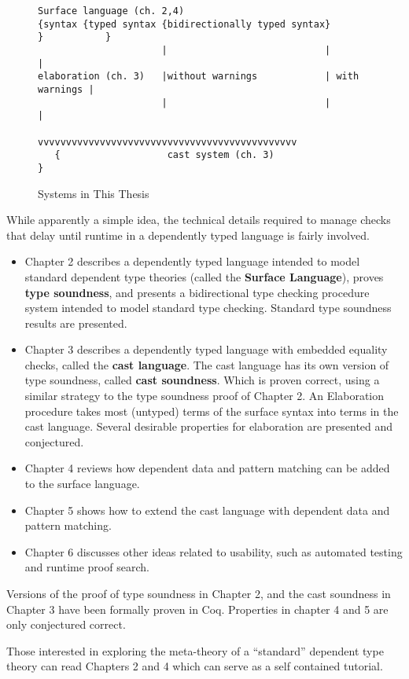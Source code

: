 \begin{figure}
\begin{lstlisting}[basicstyle={\ttfamily\tiny}]
Surface language (ch. 2,4)
{syntax {typed syntax {bidirectionally typed syntax}       }           }
                      |                            |               |
elaboration (ch. 3)   |without warnings            | with warnings |
                      |                            |               |
                      vvvvvvvvvvvvvvvvvvvvvvvvvvvvvvvvvvvvvvvvvvvvvv
   {                   cast system (ch. 3)                             }

\end{lstlisting}


\caption{Systems in This Thesis}
\label{fig:intro-thesis-workflow-1}
\end{figure}

While apparently a simple idea, the technical details required to manage checks that delay until runtime in a dependently typed language is fairly involved.

\begin{itemize}
\item Chapter 2 describes a dependently typed language intended to model standard dependent type theories (called the\textbf{ Surface Language}), proves \textbf{type soundness}, and presents a bidirectional type checking procedure system intended to model standard type checking.
Standard type soundness results are presented.
\item Chapter 3 describes a dependently typed language with embedded equality checks, called the \textbf{cast language}.
The cast language has its own version of type soundness, called \textbf{cast soundness}.
Which is proven correct, using a similar strategy to the type soundness proof of Chapter 2.
An Elaboration procedure takes most (untyped) terms of the surface syntax into terms in the cast language.
Several desirable properties for elaboration are presented and conjectured.
\item Chapter 4 reviews how dependent data and pattern matching can be added to the surface language.
\item Chapter 5 shows how to extend the cast language with dependent data and pattern matching.
\item Chapter 6 discusses other ideas related to usability, such as automated testing and runtime proof search.
\end{itemize}
Versions of the proof of type soundness in Chapter 2, and the cast soundness in Chapter 3 have been formally proven in Coq.
Properties in chapter 4 and 5 are only conjectured correct.

Those interested in exploring the meta-theory of a ``standard'' dependent type theory can read Chapters 2 and 4 which can serve as a self contained tutorial.

